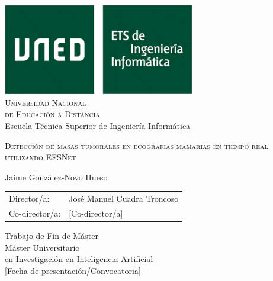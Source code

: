 \begin{titlepage}
\centering
	\includegraphics[height=4cm]{imagenes/logo_informatica_s.png}\\
	\vspace{0.25cm}
 	{\Large \textsc{{Universidad Nacional\\ de Educación a Distancia}}}\\
 	\vspace{0.8cm}
	{\Large Escuela Técnica Superior de Ingeniería Informática}\\
	\vspace{0.25cm}
	\vspace{1.5cm}
    \begin{spacing}{2}
 	{\textsc{\Huge Detección de masas tumorales en ecografías mamarias en tiempo real utilizando EFSNet}}
    \end{spacing}
	\vfill
	{\Large Jaime González-Novo Hueso}\\
	\vspace{0.3cm}
	\begin{tabular}{ll}
	\large Director/a: & \large José Manuel Cuadra Troncoso\\
	\vspace{0.3cm}
	\large Co-director/a: & \large [Co-director/a]
	\end{tabular}
	
	\vfill
	{\Large Trabajo de Fin de Máster}\\
	\vspace{0.3cm}
	{\large Máster Universitario\\ en Investigación en Inteligencia Artificial}\\
	\vspace{0.25cm}
	[Fecha de presentación/Convocatoria]
\end{titlepage}